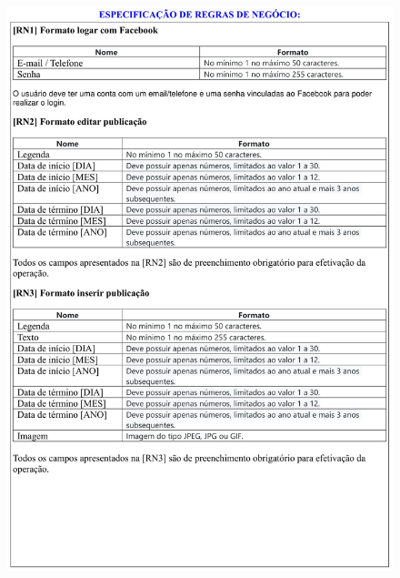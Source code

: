 \begin{figure}
    \includegraphics[width=\textwidth]{documentacao/ModeloArtefatos-01.jpg}
\end{figure}


